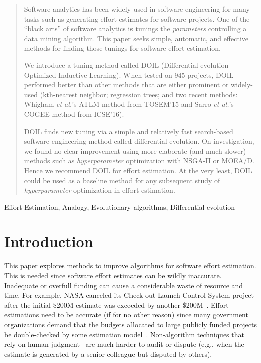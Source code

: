 \documentclass[10pt,conference]{IEEEtran}
\begin{document}
\begin{abstract}
Software analytics has  been widely used in software engineering for many tasks such as 
generating effort estimates for  software projects.
One 
of the ``black arts'' of software analytics is  tunings the {\em parameters}
controlling a  data mining algorithm.
This paper seeks simple, automatic, and   effective methods for finding those tunings for software effort estimation.

We introduce a   tuning method 
called DOIL  (Differential evolution Optimized Inductive Learning). 
When tested on  945 projects, DOIL
  performed  better than 
other methods that are 
 either prominent or widely-used 
(kth-nearest neighbor; regression trees;   and  two
recent    methods: Whigham {\it et al.}'s ATLM method from TOSEM'15
and Sarro {\it et al.}'s
   COGEE method from ICSE'16). 
   
   DOIL finds new tuning via a simple and relatively fast
   search-based software engineering method called differential evolution.
On investigation, we found no clear improvement  using more
   elaborate (and much slower) methods such as  {\em hyperparameter} optimization with NSGA-II or MOEA/D.
Hence we recommend  DOIL   for effort estimation.
At the very least, DOIL could be used as a  baseline method for
any subsequent study of {\em hyperparameter} optimization in effort estimation.
\end{abstract}
\begin{IEEEkeywords}
Effort Estimation, Analogy, Evolutionary algorithms, Differential evolution
\end{IEEEkeywords}
 


\section{Introduction}\label{sect:intro}

This paper explores methods to improve algorithms
for software effort estimation.
This is needed since software  effort estimates   can be 
wildly inaccurate\cite{kemerer1987empirical}. Inadequate or overfull funding can cause a considerable waste of resource and time. For example, NASA canceled its  Check-out Launch Control System project after the initial \$200M estimate was exceeded by another \$200M~\cite{cowing02}. Effort estimations need to be accurate  (if for
no other reason) since many government
organizations demand that the budgets allocated to
large publicly funded projects be double-checked by some estimation model~\cite{MenziesNeg:2017}.  
Non-algorithm techniques that rely on human judgment~\cite{jorgensen2004review} are much harder to  
audit or 
dispute (e.g.,  when the estimate is generated by a senior colleague but disputed by others). 
\end{document}
